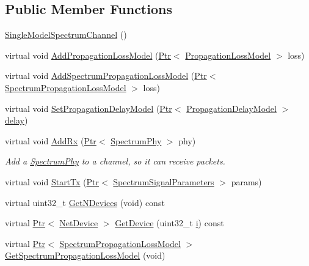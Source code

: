 \subsection*{Public Member Functions}
\begin{DoxyCompactItemize}
\item 
\hyperlink{classns3_1_1SingleModelSpectrumChannel_a762ce1ae306c632181512a18593d68a7}{Single\+Model\+Spectrum\+Channel} ()
\item 
virtual void \hyperlink{classns3_1_1SingleModelSpectrumChannel_a3d8c68e54e0e7659fdf715260d5613ac}{Add\+Propagation\+Loss\+Model} (\hyperlink{classns3_1_1Ptr}{Ptr}$<$ \hyperlink{classns3_1_1PropagationLossModel}{Propagation\+Loss\+Model} $>$ loss)
\item 
virtual void \hyperlink{classns3_1_1SingleModelSpectrumChannel_a8b731f20817893cd9a2b9e410197da2b}{Add\+Spectrum\+Propagation\+Loss\+Model} (\hyperlink{classns3_1_1Ptr}{Ptr}$<$ \hyperlink{classns3_1_1SpectrumPropagationLossModel}{Spectrum\+Propagation\+Loss\+Model} $>$ loss)
\item 
virtual void \hyperlink{classns3_1_1SingleModelSpectrumChannel_afd757c085623596ebf3da8264cfbaa45}{Set\+Propagation\+Delay\+Model} (\hyperlink{classns3_1_1Ptr}{Ptr}$<$ \hyperlink{classns3_1_1PropagationDelayModel}{Propagation\+Delay\+Model} $>$ \hyperlink{mmwave_2model_2fading-traces_2fading__trace__generator_8m_a7964e6aa8f61a9d28973c8267a606ad8}{delay})
\item 
virtual void \hyperlink{classns3_1_1SingleModelSpectrumChannel_aa4d9c2a281248582eb49d3b41a0416bb}{Add\+Rx} (\hyperlink{classns3_1_1Ptr}{Ptr}$<$ \hyperlink{classns3_1_1SpectrumPhy}{Spectrum\+Phy} $>$ phy)
\begin{DoxyCompactList}\small\item\em Add a \hyperlink{classns3_1_1SpectrumPhy}{Spectrum\+Phy} to a channel, so it can receive packets. \end{DoxyCompactList}\item 
virtual void \hyperlink{classns3_1_1SingleModelSpectrumChannel_a4288a4e2399b6257fcba2634f54a2256}{Start\+Tx} (\hyperlink{classns3_1_1Ptr}{Ptr}$<$ \hyperlink{structns3_1_1SpectrumSignalParameters}{Spectrum\+Signal\+Parameters} $>$ params)
\item 
virtual uint32\+\_\+t \hyperlink{classns3_1_1SingleModelSpectrumChannel_a3443ad98afacad544c1772a7b591d403}{Get\+N\+Devices} (void) const 
\item 
virtual \hyperlink{classns3_1_1Ptr}{Ptr}$<$ \hyperlink{classns3_1_1NetDevice}{Net\+Device} $>$ \hyperlink{classns3_1_1SingleModelSpectrumChannel_a01f09605eee3210cd70c9180f63d4cad}{Get\+Device} (uint32\+\_\+t \hyperlink{lte__uplink__power__control_8m_a6f6ccfcf58b31cb6412107d9d5281426}{i}) const 
\item 
virtual \hyperlink{classns3_1_1Ptr}{Ptr}$<$ \hyperlink{classns3_1_1SpectrumPropagationLossModel}{Spectrum\+Propagation\+Loss\+Model} $>$ \hyperlink{classns3_1_1SingleModelSpectrumChannel_a5e3a4b54b3864628f85346013d383d77}{Get\+Spectrum\+Propagation\+Loss\+Model} (void)
\end{DoxyCompactItemize}
